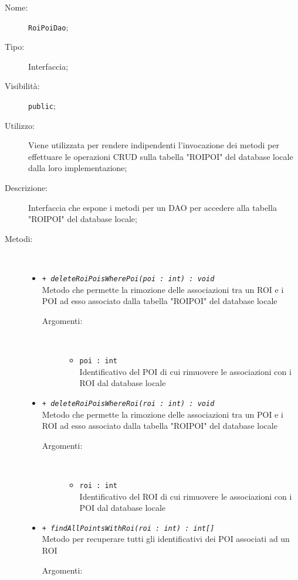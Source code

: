 \documentclass[../DefinizioneDiProdotto.tex]{subfiles}
\begin{document}
    \begin{description}
\item[Nome:] \texttt{RoiPoiDao};
\item[Tipo:] Interfaccia;
\item[Visibilità:] \texttt{public};
\item[Utilizzo:] Viene utilizzata per rendere indipendenti l'invocazione dei metodi per effettuare le operazioni CRUD sulla tabella "ROIPOI" del database locale dalla loro implementazione;
\item[Descrizione:] Interfaccia che espone i metodi per un DAO per accedere alla tabella "ROIPOI" del database locale;
\item[Metodi:] \
\begin{itemize}
\item \texttt{+ \textit{deleteRoiPoisWherePoi(poi : int) : void}}\\
Metodo che permette la rimozione delle associazioni tra un ROI e i POI ad esso associato dalla tabella "ROIPOI" del database locale 
 \begin{description}
\item[Argomenti:] \
\begin{itemize}
\item \texttt{poi : int}\\
Identificativo del POI di cui rimuovere le associazioni con i ROI dal database locale\end{itemize}
\end{description}
\item \texttt{+ \textit{deleteRoiPoisWhereRoi(roi : int) : void}}\\
Metodo che permette la rimozione delle associazioni tra un POI e i ROI ad esso associato dalla tabella "ROIPOI" del database locale 
 \begin{description}
\item[Argomenti:] \
\begin{itemize}
\item \texttt{roi : int}\\
Identificativo del ROI di cui rimuovere le associazioni con i POI dal database locale\end{itemize}
\end{description}
\item \texttt{+ \textit{findAllPointsWithRoi(roi : int) : int[]}}\\
Metodo per recuperare tutti gli identificativi dei POI associati ad un ROI 
 \begin{description}
\item[Argomenti:] \

\end{description}
\end{itemize}
\end{description}
\end{document}
